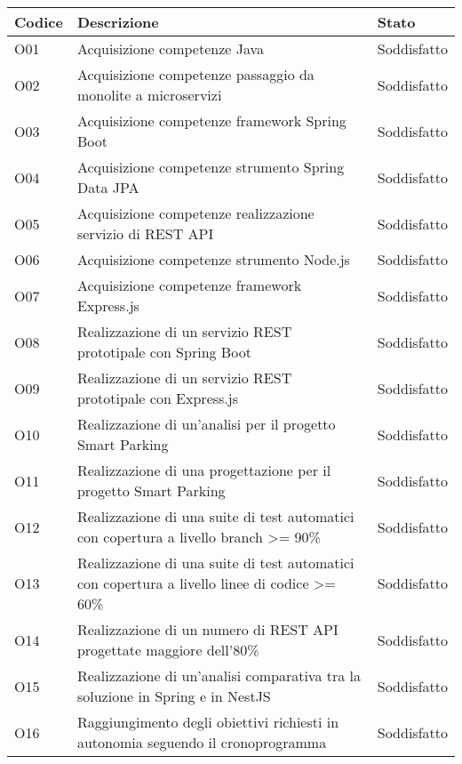 \begin{table}[H]
    \begin{tabular}{|p{1.5cm}|p{7.7cm}|p{2cm}|} 
    \hline
    \textbf{Codice} & \textbf{Descrizione} & \textbf{Stato} \\ 
    \hline
    O01 & Acquisizione competenze Java & Soddisfatto \\
    \hline
    O02 & Acquisizione competenze passaggio da monolite a microservizi & Soddisfatto \\
    \hline
    O03 & Acquisizione competenze framework Spring Boot & Soddisfatto \\
    \hline
    O04 & Acquisizione competenze strumento Spring Data JPA & Soddisfatto \\
    \hline
    O05 & Acquisizione competenze realizzazione servizio di REST API & Soddisfatto \\
    \hline
    O06 & Acquisizione competenze strumento Node.js & Soddisfatto \\
    \hline
    O07 & Acquisizione competenze framework Express.js & Soddisfatto \\
    \hline
    O08 & Realizzazione di un servizio REST prototipale con Spring Boot & Soddisfatto \\
    \hline
    O09 & Realizzazione di un servizio REST prototipale con Express.js & Soddisfatto \\
    \hline
    O10 & Realizzazione di un'analisi per il progetto Smart Parking & Soddisfatto \\
    \hline
    O11 & Realizzazione di una progettazione per il progetto Smart Parking & Soddisfatto \\
    \hline
    O12 & Realizzazione di una suite di test automatici con copertura a livello branch >= 90\% & Soddisfatto \\
    \hline
    O13 & Realizzazione di una suite di test automatici con copertura a livello linee di codice >= 60\% & Soddisfatto \\
    \hline
    O14 & Realizzazione di un numero di REST API progettate maggiore dell'80\% & Soddisfatto \\
    \hline
    O15 & Realizzazione di un'analisi comparativa tra la soluzione in Spring e in NestJS & Soddisfatto \\
    \hline
    O16 & Raggiungimento degli obiettivi richiesti in autonomia seguendo il cronoprogramma & Soddisfatto \\
    \hline
    \end{tabular}
\end{table}
